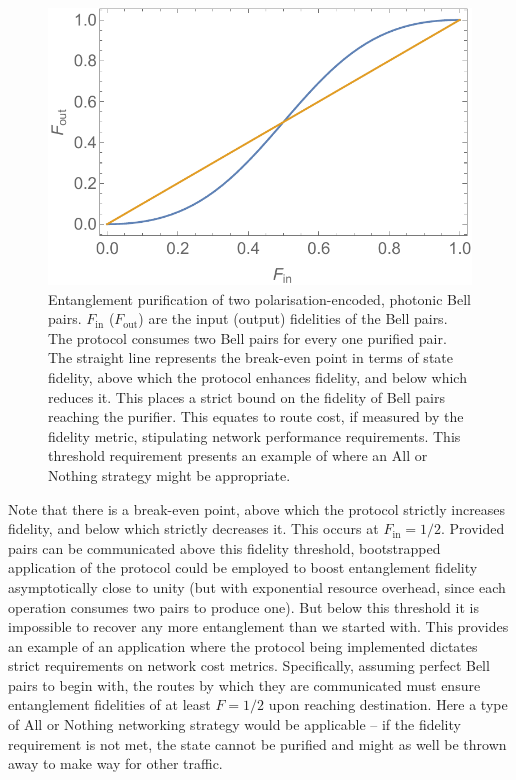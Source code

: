 \documentclass[aps,rmp,twocolumn,amsmath,amssymb,nofootinbib,superscriptaddress,longbibliography,floatfix]{revtex4-1}
\begin{document}
\begin{figure}[!htb]
\includegraphics[width=\columnwidth]{ent_purif}
\caption{Entanglement purification of two polarisation-encoded, photonic Bell pairs. $F_\mathrm{in}$ ($F_\mathrm{out}$) are the input (output) fidelities of the Bell pairs. The protocol consumes two Bell pairs for every one purified pair. The straight line represents the break-even point in terms of state fidelity, above which the protocol enhances fidelity, and below which reduces it. This places a strict bound on the fidelity of Bell pairs reaching the purifier. This equates to route cost, if measured by the fidelity metric, stipulating network performance requirements. This threshold requirement presents an example of where an {\sc All or Nothing} strategy might be appropriate.} \label{fig:ent_purif}
\end{figure}

Note that there is a break-even point, above which the protocol strictly increases fidelity, and below which strictly decreases it. This occurs at \mbox{$F_\mathrm{in}=1/2$}. Provided pairs can be communicated above this fidelity threshold, bootstrapped application of the protocol could be employed to boost entanglement fidelity asymptotically close to unity (but with exponential resource overhead, since each operation consumes two pairs to produce one). But below this threshold it is impossible to recover any more entanglement than we started with. This provides an example of an application where the protocol being implemented dictates strict requirements on network cost metrics. Specifically, assuming perfect Bell pairs to begin with, the routes by which they are communicated must ensure entanglement fidelities of at least \mbox{$F=1/2$} upon reaching destination. Here a type of {\sc All or Nothing} networking strategy would be applicable -- if the fidelity requirement is not met, the state cannot be purified and might as well be thrown away to make way for other traffic.
\end{document}
